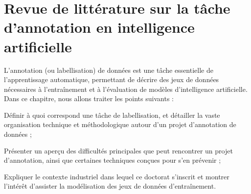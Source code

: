 \chapter{Revue de littérature sur la tâche d'annotation en intelligence artificielle}
\label{chapter:2-REVUE-DE-LITTERATURE}
	
	L'annotation (ou labellisation) de données est une tâche essentielle de l'apprentissage automatique, permettant de décrire des jeux de données nécessaires à l'entraînement et à l'évaluation de modèles d'intelligence artificielle.
	Dans ce chapitre, nous allons traiter les points suivants :
	\begin{leftBarImportantRed}
		\begin{todolist}
			\item Définir à quoi correspond une tâche de labellisation, et détailler la vaste organisation technique et méthodologique autour d'un projet d'annotation de données ;
			\item Présenter un aperçu des difficultés principales que peut rencontrer un projet d'annotation, ainsi que certaines techniques conçues pour s'en prévenir ;
			\item Expliquer le contexte industriel dans lequel ce doctorat s'inscrit et montrer l'intérêt d'assister la modélisation des jeux de données d'entraînement.
		\end{todolist}
	\end{leftBarImportantRed}
	
	\minitoc
	
	
	
	
	
	
	
	
	
	
	